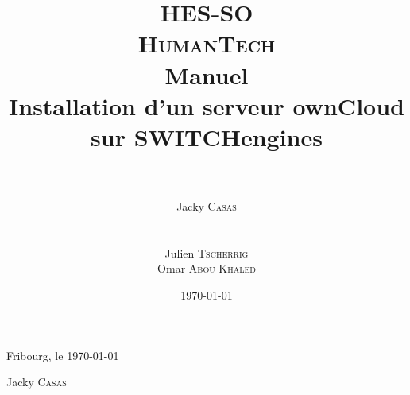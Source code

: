 \documentclass[a4paper, 12pt]{report}
\title{\huge{HES-SO} \\ \Huge{\textbf{\textsc{HumanTech}}} \\
\vspace{2cm} \huge{\textbf{Manuel}} \\ 
\huge{Installation d'un serveur ownCloud sur SWITCHengines}}
\author{\\ \\ Jacky \textsc{Casas} \\
\\ \\
Julien \textsc{Tscherrig} \\
Omar \textsc{Abou Khaled}}
\date{\today}
\begin{document}
\maketitle %
\newpage

\tableofcontents
\newpage

%


%
%


\vspace{3cm}
Fribourg, le \today

\vspace{1cm}

\hspace{11cm} Jacky \textsc{Casas}

\vspace{2cm}


%
\end{document}

